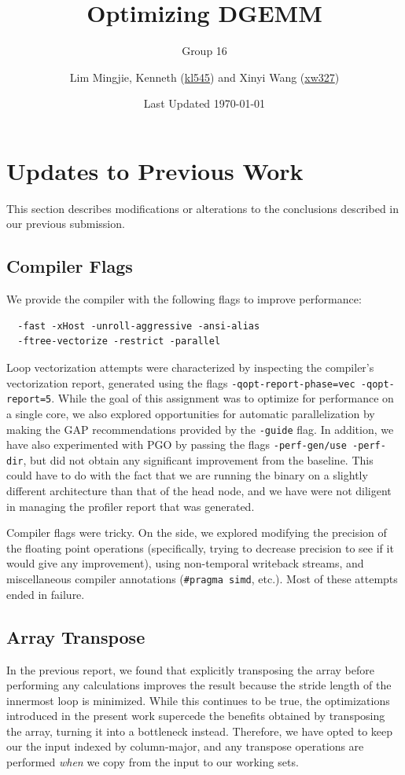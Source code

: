 \documentclass{scrartcl}
\title{Optimizing DGEMM}
\subtitle{Group 16}
\date{Last Updated \today}
\author{Lim Mingjie, Kenneth (\href{mailto:kl545@cornell.edu}{kl545}) and Xinyi Wang (\href{mailto:xw327@cornell.edu}{xw327})}
\begin{document}
  \maketitle
  \section{Updates to Previous Work}
    This section describes modifications or alterations to the conclusions described in our previous submission.

    \subsection{Compiler Flags}

    We provide the compiler with the following flags to improve performance:
    \begin{verbatim}
  -fast -xHost -unroll-aggressive -ansi-alias
  -ftree-vectorize -restrict -parallel\end{verbatim}
    Loop vectorization attempts were characterized by inspecting the compiler's vectorization report, generated using the flags \verb|-qopt-report-phase=vec -qopt-report=5|. While the goal of this assignment was to optimize for performance on a single core, we also explored opportunities for automatic parallelization by making the GAP recommendations provided by the \verb|-guide| flag. In addition, we have also experimented with PGO by passing the flags \verb|-perf-gen/use -perf-dir|, but did not obtain any significant improvement from the baseline. This could have to do with the fact that we are running the binary on a slightly different architecture than that of the head node, and we have were not diligent in managing the profiler report that was generated.

    Compiler flags were tricky. On the side, we explored modifying the precision of the floating point operations (specifically, trying to decrease precision to see if it would give any improvement), using non-temporal writeback streams, and miscellaneous compiler annotations (\verb|#pragma simd|, etc.). Most of these attempts ended in failure.

    \subsection{Array Transpose}

    In the previous report, we found that explicitly transposing the array before performing any calculations improves the result because the stride length of the innermost loop is minimized. While this continues to be true, the optimizations introduced in the present work supercede the benefits obtained by transposing the array, turning it into a bottleneck instead. Therefore, we have opted to keep our the input indexed by column-major, and any transpose operations are performed \emph{when} we copy from the input to our working sets.
\end{document}

